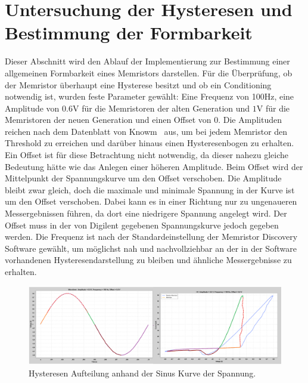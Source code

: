 \section{Untersuchung der Hysteresen und Bestimmung der Formbarkeit}
Dieser Abschnitt wird den Ablauf der Implementierung zur Bestimmung einer allgemeinen Formbarkeit eines Memristors darstellen. Für die Überprüfung, ob der Memristor überhaupt eine Hysterese besitzt und ob ein Conditioning notwendig ist, wurden feste Parameter gewählt: Eine Frequenz von 100Hz, eine Amplitude von $0.6$V für die Memristoren der alten Generation und $1$V für die Memristoren der neuen Generation und einen Offset von 0. Die Amplituden reichen nach dem Datenblatt von Knowm~\cite{knowm_comp_2019} aus, um bei jedem Memristor den Threshold zu erreichen und darüber hinaus einen Hysteresenbogen zu erhalten. Ein Offset ist für diese Betrachtung nicht notwendig, da dieser nahezu gleiche Bedeutung hätte wie das Anlegen einer höheren Amplitude. Beim Offset wird der Mittelpunkt der Spannungskurve um den Offset verschoben. Die Amplitude bleibt zwar gleich, doch die maximale und minimale Spannung in der Kurve ist um den Offset verschoben. Dabei kann es in einer Richtung nur zu ungenaueren Messergebnissen führen, da dort eine niedrigere Spannung angelegt wird. Der Offset muss in der von Digilent gegebenen Spannungskurve jedoch gegeben werden. Die Frequenz ist nach der Standardeinstellung der Memristor Discovery Software gewählt, um möglichst nah und nachvollziehbar an der in der Software vorhandenen Hysteresendarstellung zu bleiben und ähnliche Messergebnisse zu erhalten.

\begin{figure}
  \centering
    \includegraphics[width=\textwidth]{images/Hysteresen_Split_3.png}
  \caption{Hysteresen Aufteilung anhand der Sinus Kurve der Spannung.}
  \label{fig:Hysteresen_Split}
\end{figure}

